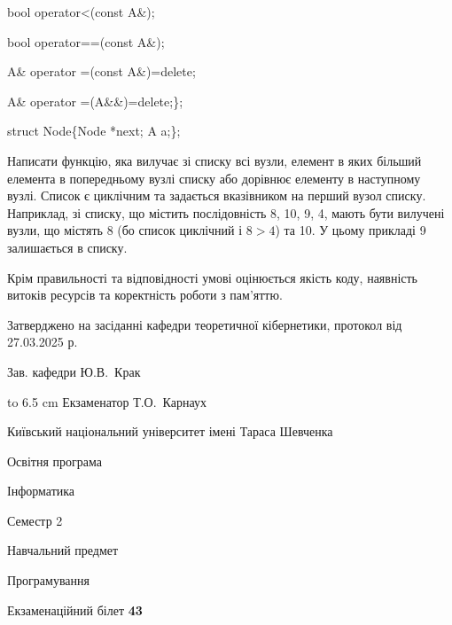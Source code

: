 \documentclass[12pt, ukrainian]{article}
\begin{document}
{\quad  bool operator<(const A\&); 

\quad  bool operator==(const A\&); 

\quad A\& operator =(const A\&)=delete; 

\quad  A\& operator =(A\&\&)=delete;\};

struct Node\{Node *next; A a;\};

 Написати функцію, яка вилучає зі списку всі вузли, елемент в яких більший елемента в попередньому вузлі списку або дорівнює елементу в наступному вузлі. Список є циклічним та задається вказівником на перший вузол списку. Наприклад, зі списку, що містить послідовність 8, 10, 9, 4, мають бути вилучені вузли, що містять 8 (бо список циклічний і $8>4$) та 10. У цьому прикладі 9 залишається в списку.

Крім правильності та відповідності умові оцінюється якість коду, наявність витоків ресурсів та коректність роботи з пам'яттю. 

}
{\smallskip\smallskip \begin {scriptsize} Затверджено на засіданні кафедри теоретичної кібернетики, протокол   від   27.03.2025 р.\par\smallskip\smallskip\smallskip\smallskip
{\parbox {6.5 cm} {Зав. кафедри \dotfill Ю.В.~Крак}}\hspace {0.7cm} {\hbox to 6.5 cm { Екзаменатор \dotfill Т.О.~Карнаух}} \end{scriptsize}}
\newpage
{{\begin {scriptsize}\par
{ \center  Київський національний університет імені Тараса Шевченка \par}
{\parbox {5 cm}{Освітня програма \hfill}{\parbox {7 cm}{Інформатика\hfill}}\parbox {6 cm}{\hfill Семестр 2}}\par
{\parbox {5 cm} {Навчальний предмет \hfill}\parbox {7 cm}{Програмування \hfill}\parbox {6cm}{\hfill}\par}\vspace{-15pt} \end{scriptsize}}{\center Екзаменаційний білет \No \textbf { 43 }\par}}
\end{document}
